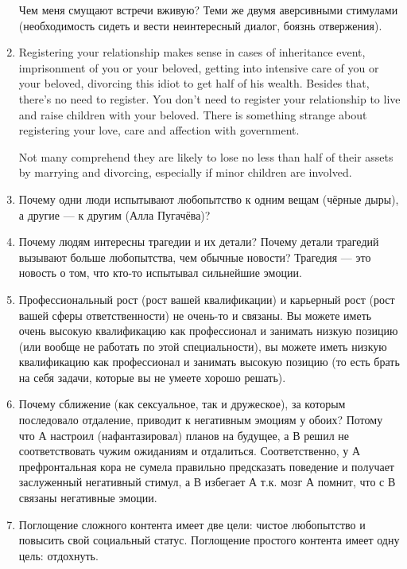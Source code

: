 \documentclass[11pt]{article}
\theoremstyle{remark}
\theoremstyle{definition}
\begin{document}
\begin{enumerate}
Чем меня смущают встречи вживую? Теми же двумя аверсивными стимулами (необходимость сидеть и вести неинтересный диалог, боязнь отвержения).



\item Registering your relationship makes sense in cases of inheritance event, imprisonment of you or your beloved, getting into intensive care of you or your beloved, divorcing this idiot to get half of his wealth. Besides that, there's no need to register. You don't need to register your relationship to live and raise children with your beloved. There is something strange about registering your love, care and affection with government.

Not many comprehend they are likely to lose no less than half of their assets by marrying and divorcing, especially if minor children are involved.



\item Почему одни люди испытывают любопытство к одним вещам (чёрные дыры), а другие --- к другим (Алла Пугачёва)?

\item Почему людям интересны трагедии и их детали? Почему детали трагедий вызывают больше любопытства, чем обычные новости? Трагедия --- это новость о том, что кто-то испытывал сильнейшие эмоции.


\item Профессиональный рост (рост вашей квалификации) и карьерный рост (рост вашей сферы ответственности) не очень-то и связаны. Вы можете иметь очень высокую квалификацию как профессионал и занимать низкую позицию (или вообще не работать по этой специальности), вы можете иметь низкую квалификацию как профессионал и занимать высокую позицию (то есть брать на себя задачи, которые вы не умеете хорошо решать).


\item Почему сближение (как сексуальное, так и дружеское), за которым последовало отдаление, приводит к негативным эмоциям у обоих? Потому что А настроил (нафантазировал) планов на будущее, а В решил не соответствовать чужим ожиданиям и отдалиться. Соответственно, у А префронтальная кора не сумела правильно предсказать поведение и получает заслуженный негативный стимул, а В избегает А т.к. мозг А помнит, что с В связаны негативные эмоции.

\item Поглощение сложного контента имеет две цели: чистое любопытство и повысить свой социальный статус. Поглощение простого контента имеет одну цель: отдохнуть.


\end{enumerate}
\end{document}
